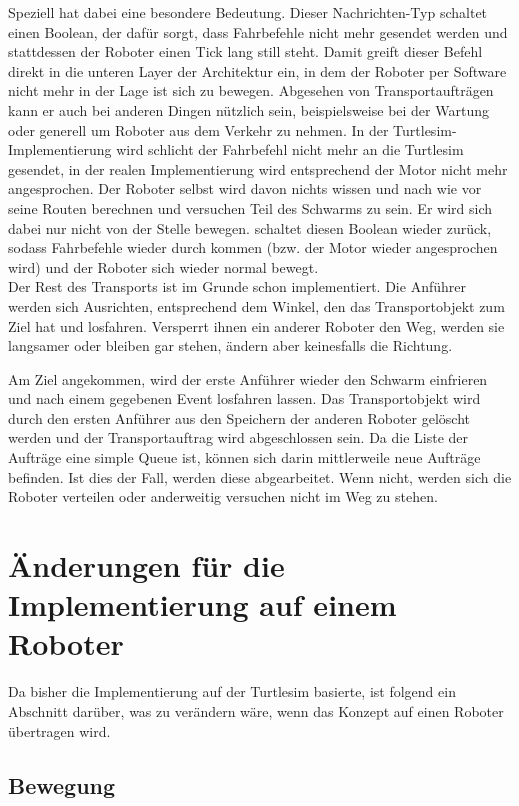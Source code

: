 Speziell  hat dabei eine besondere Bedeutung. Dieser Nachrichten-Typ schaltet einen Boolean, der dafür sorgt, dass Fahrbefehle nicht mehr gesendet werden und stattdessen der Roboter einen Tick lang still steht. Damit greift dieser Befehl direkt in die unteren Layer der Architektur ein, in dem der Roboter per Software nicht mehr in der Lage ist sich zu bewegen. Abgesehen von Transportaufträgen kann er auch bei anderen Dingen nützlich sein, beispielsweise bei der Wartung oder generell um Roboter aus dem Verkehr zu nehmen. In der Turtlesim-Implementierung wird schlicht der Fahrbefehl nicht mehr an die Turtlesim gesendet, in der realen Implementierung wird entsprechend der Motor nicht mehr angesprochen. Der Roboter selbst wird davon nichts wissen und nach wie vor seine Routen berechnen und versuchen Teil des Schwarms zu sein. Er wird sich dabei nur nicht von der Stelle bewegen.  schaltet diesen Boolean wieder zurück, sodass Fahrbefehle wieder durch kommen (bzw. der Motor wieder angesprochen wird) und der Roboter sich wieder normal bewegt.\\

Der Rest des Transports ist im Grunde schon implementiert. Die Anführer werden sich Ausrichten, entsprechend dem Winkel, den das Transportobjekt zum Ziel hat und losfahren. Versperrt ihnen ein anderer Roboter den Weg, werden sie langsamer oder bleiben gar stehen, ändern aber keinesfalls die Richtung.

Am Ziel angekommen, wird der erste Anführer wieder den Schwarm einfrieren und nach einem gegebenen Event losfahren lassen. Das Transportobjekt wird durch den ersten Anführer aus den Speichern der anderen Roboter gelöscht werden und der Transportauftrag wird abgeschlossen sein. Da die Liste der Aufträge eine simple Queue ist, können sich darin mittlerweile neue Aufträge befinden. Ist dies der Fall, werden diese abgearbeitet. Wenn nicht, werden sich die Roboter verteilen oder anderweitig versuchen nicht im Weg zu stehen.

\section{Änderungen für die Implementierung auf einem Roboter}

Da bisher die Implementierung auf der Turtlesim basierte, ist folgend ein Abschnitt darüber, was zu verändern wäre, wenn das Konzept auf einen Roboter übertragen wird.

\subsection*{Bewegung}


